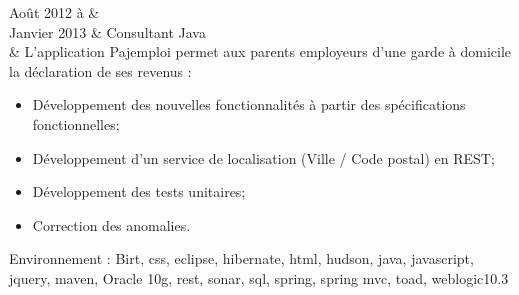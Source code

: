 Août 2012 à 	&  \\%
Janvier 2013    & Consultant Java \\%
                & L'application Pajemploi permet aux parents employeurs d'une garde à domicile la déclaration de ses revenus :%
                \begin{itemize}%
    				\item Développement des nouvelles fonctionnalités à partir des spécifications fonctionnelles;%
					\item Développement d'un service de localisation (Ville / Code postal) en REST;%
					\item Développement des tests unitaires;%
					\item Correction des anomalies.%
				\end{itemize}%
Environnement : Birt, css, eclipse, hibernate, html, hudson, java, javascript, jquery, maven, Oracle 10g, rest, sonar, sql, spring, spring mvc, toad, weblogic10.3 \\\\
